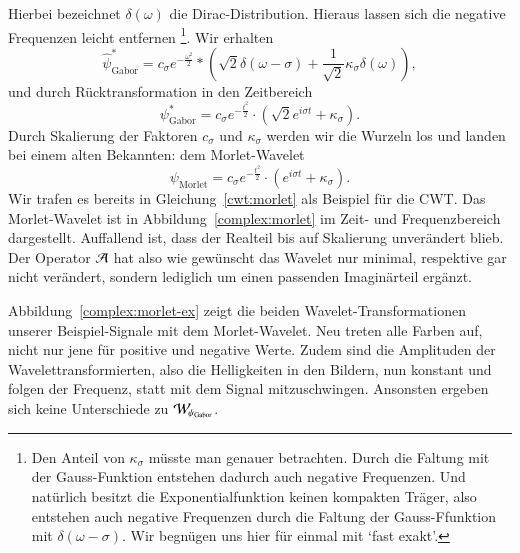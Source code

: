 Hierbei bezeichnet $\delta(\omega)$ die Dirac-Distribution.
Hieraus lassen sich die negative Frequenzen leicht entfernen
\footnote{
	Den Anteil von $\kappa_\sigma$ müsste man genauer betrachten.
	Durch die Faltung mit der Gauss-Funktion entstehen dadurch auch negative Frequenzen.
	Und natürlich besitzt die Exponentialfunktion keinen kompakten Träger, also entstehen auch negative Frequenzen durch die Faltung der Gauss-Ffunktion mit $\delta(\omega - \sigma)$.
	Wir begnügen uns hier für einmal mit `fast exakt'.
}.
Wir erhalten
\[
	\hat{\psi}^\ast_\text{Gabor} = 
	c_\sigma e^{- \frac{\omega^2}{2}} * (
	\!\sqrt 2 \delta(\omega - \sigma) +
	\frac{1}{\sqrt 2}\kappa_\sigma\delta(\omega) ),
\]
und durch Rücktransformation in den Zeitbereich
\[
	\psi^\ast_\text{Gabor} = c_\sigma e^{- \frac{t^2}{2}} \cdot (\!\sqrt 2 e^{i\sigma t} +	\kappa_\sigma ).
\]
Durch Skalierung der Faktoren $c_\sigma$ und $\kappa_\sigma$ werden wir die Wurzeln los und landen bei einem alten Bekannten: dem Morlet-Wavelet
\[\psi_\text{Morlet} = c_\sigma e^{- \frac{t^2}{2}} \cdot (e^{i\sigma t} + \kappa_\sigma).\]
Wir trafen es bereits in Gleichung~\eqref{cwt:morlet} als Beispiel für die CWT.
Das Morlet-Wavelet ist in Abbildung~\ref{complex:morlet} im Zeit- und Frequenzbereich dargestellt.
Auffallend ist, dass der Realteil bis auf Skalierung unverändert blieb.
Der Operator $\Ana\,$ hat also wie gewünscht das Wavelet nur minimal, respektive gar nicht verändert, sondern lediglich um einen passenden Imaginärteil ergänzt.

Abbildung~\ref{complex:morlet-ex} zeigt die beiden Wavelet-Transformationen unserer Beispiel-Signale mit dem Morlet-Wavelet.
Neu treten alle Farben auf, nicht nur jene für positive und negative Werte.
Zudem sind die Amplituden der Wavelettransformierten, also die Helligkeiten in den Bildern, nun konstant und folgen der Frequenz, statt mit dem Signal mitzuschwingen.
Ansonsten ergeben sich keine Unterschiede zu $\Wave_{\psi_\text{Gabor}}$.

